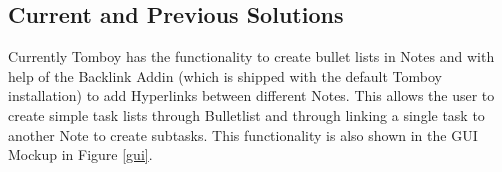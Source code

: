 \subsection{Current and Previous Solutions}
\label{description:solution}
Currently Tomboy has the functionality to create bullet lists in Notes and with help of the Backlink Addin (which is shipped with the default Tomboy installation) to add Hyperlinks between different Notes. This allows the user to create simple task lists through Bulletlist and through linking a single task to another Note to create subtasks. This functionality is also shown in the GUI Mockup in Figure \ref{gui}.





